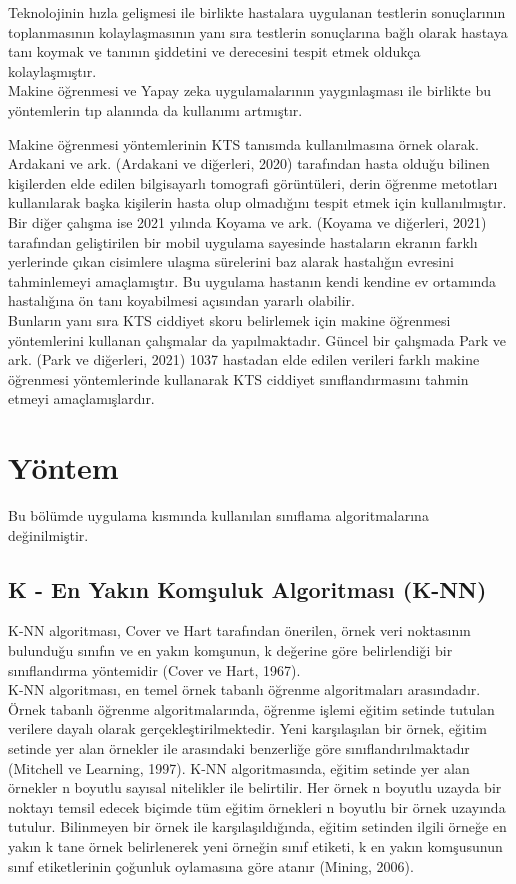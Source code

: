 \documentclass[12pt,twoside]{deuthesis}
\begin{document}
Teknolojinin hızla gelişmesi ile birlikte hastalara uygulanan testlerin sonuçlarının toplanmasının kolaylaşmasının yanı sıra testlerin sonuçlarına bağlı olarak hastaya tanı koymak ve tanının şiddetini ve derecesini tespit etmek oldukça kolaylaşmıştır.\\
Makine öğrenmesi ve Yapay zeka uygulamalarının yaygınlaşması ile birlikte bu yöntemlerin tıp alanında da kullanımı artmıştır.

Makine öğrenmesi yöntemlerinin KTS tanısında kullanılmasına örnek olarak.
Ardakani ve ark. (Ardakani ve diğerleri, 2020) tarafından hasta olduğu bilinen kişilerden elde edilen bilgisayarlı tomografi görüntüleri, derin öğrenme metotları kullanılarak başka kişilerin hasta olup olmadığını tespit etmek için kullanılmıştır.\\
Bir diğer çalışma ise 2021 yılında Koyama ve ark. (Koyama ve diğerleri, 2021) tarafından geliştirilen bir mobil uygulama sayesinde hastaların ekranın farklı yerlerinde çıkan cisimlere ulaşma sürelerini baz alarak hastalığın evresini tahminlemeyi amaçlamıştır. Bu uygulama hastanın kendi kendine ev ortamında hastalığına ön tanı koyabilmesi açısından yararlı olabilir.\\
Bunların yanı sıra KTS ciddiyet skoru belirlemek için makine öğrenmesi yöntemlerini kullanan çalışmalar da yapılmaktadır.
Güncel bir çalışmada Park ve ark. (Park ve diğerleri, 2021) 1037 hastadan elde edilen verileri farklı makine öğrenmesi yöntemlerinde kullanarak KTS ciddiyet sınıflandırmasını tahmin etmeyi amaçlamışlardır.

\hypertarget{yontem}{%
\chapter{Yöntem}\label{yontem}}

Bu bölümde uygulama kısmında kullanılan sınıflama algoritmalarına değinilmiştir.

\hypertarget{knn}{%
\section{K - En Yakın Komşuluk Algoritması (K-NN)}\label{knn}}

K-NN algoritması, Cover ve Hart tarafından önerilen, örnek veri noktasının bulunduğu sınıfın ve en yakın komşunun, k değerine göre belirlendiği bir sınıflandırma yöntemidir (Cover ve Hart, 1967).\\
K-NN algoritması, en temel örnek tabanlı öğrenme algoritmaları arasındadır. Örnek tabanlı öğrenme algoritmalarında, öğrenme işlemi eğitim setinde tutulan verilere dayalı olarak gerçekleştirilmektedir. Yeni karşılaşılan bir örnek, eğitim setinde yer alan örnekler ile arasındaki benzerliğe göre sınıflandırılmaktadır (Mitchell ve Learning, 1997). K-NN algoritmasında, eğitim setinde yer alan örnekler n boyutlu sayısal nitelikler ile belirtilir. Her örnek n boyutlu uzayda bir noktayı temsil edecek biçimde tüm eğitim örnekleri n boyutlu bir örnek uzayında tutulur. Bilinmeyen bir örnek ile karşılaşıldığında, eğitim setinden ilgili örneğe en yakın k tane örnek belirlenerek yeni örneğin sınıf etiketi, k en yakın komşusunun sınıf etiketlerinin çoğunluk oylamasına göre atanır (Mining, 2006).
\end{document}
